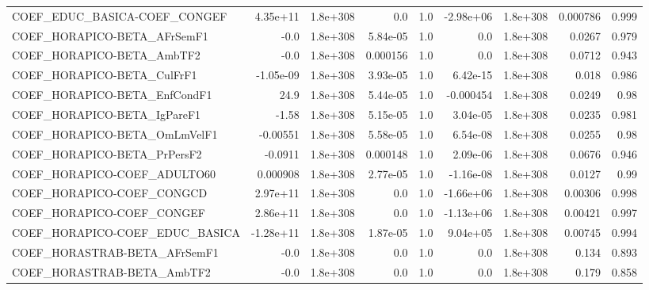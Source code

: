 \begin{tabular}{lrrrrrrrr}
COEF\_EDUC\_BASICA-COEF\_CONGEF          &    4.35e+11 &     1.8e+308 &        0.0 &      1.0 &  -2.98e+06 &    1.8e+308 &     0.000786 &         0.999 \\
COEF\_HORAPICO-BETA\_AFrSemF1           &        -0.0 &     1.8e+308 &   5.84e-05 &      1.0 &        0.0 &    1.8e+308 &       0.0267 &         0.979 \\
COEF\_HORAPICO-BETA\_AmbTF2             &        -0.0 &     1.8e+308 &   0.000156 &      1.0 &        0.0 &    1.8e+308 &       0.0712 &         0.943 \\
COEF\_HORAPICO-BETA\_CulFrF1            &   -1.05e-09 &     1.8e+308 &   3.93e-05 &      1.0 &   6.42e-15 &    1.8e+308 &        0.018 &         0.986 \\
COEF\_HORAPICO-BETA\_EnfCondF1          &        24.9 &     1.8e+308 &   5.44e-05 &      1.0 &  -0.000454 &    1.8e+308 &       0.0249 &          0.98 \\
COEF\_HORAPICO-BETA\_IgPareF1           &       -1.58 &     1.8e+308 &   5.15e-05 &      1.0 &   3.04e-05 &    1.8e+308 &       0.0235 &         0.981 \\
COEF\_HORAPICO-BETA\_OmLmVelF1          &    -0.00551 &     1.8e+308 &   5.58e-05 &      1.0 &   6.54e-08 &    1.8e+308 &       0.0255 &          0.98 \\
COEF\_HORAPICO-BETA\_PrPersF2           &     -0.0911 &     1.8e+308 &   0.000148 &      1.0 &   2.09e-06 &    1.8e+308 &       0.0676 &         0.946 \\
COEF\_HORAPICO-COEF\_ADULTO60           &    0.000908 &     1.8e+308 &   2.77e-05 &      1.0 &  -1.16e-08 &    1.8e+308 &       0.0127 &          0.99 \\
COEF\_HORAPICO-COEF\_CONGCD             &    2.97e+11 &     1.8e+308 &        0.0 &      1.0 &  -1.66e+06 &    1.8e+308 &      0.00306 &         0.998 \\
COEF\_HORAPICO-COEF\_CONGEF             &    2.86e+11 &     1.8e+308 &        0.0 &      1.0 &  -1.13e+06 &    1.8e+308 &      0.00421 &         0.997 \\
COEF\_HORAPICO-COEF\_EDUC\_BASICA        &   -1.28e+11 &     1.8e+308 &   1.87e-05 &      1.0 &   9.04e+05 &    1.8e+308 &      0.00745 &         0.994 \\
COEF\_HORASTRAB-BETA\_AFrSemF1          &        -0.0 &     1.8e+308 &        0.0 &      1.0 &        0.0 &    1.8e+308 &        0.134 &         0.893 \\
COEF\_HORASTRAB-BETA\_AmbTF2            &        -0.0 &     1.8e+308 &        0.0 &      1.0 &        0.0 &    1.8e+308 &        0.179 &         0.858 \\

\end{tabular}
